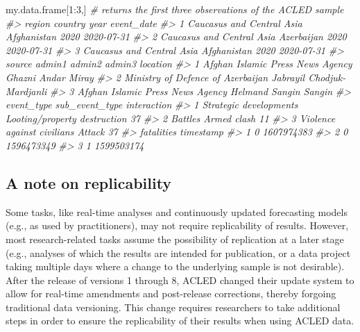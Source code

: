 \documentclass[
]{article}
\newenvironment{Shaded}{\begin{snugshade}}{\end{snugshade}}
\newcommand{\CommentTok}[1]{\textcolor[rgb]{0.56,0.35,0.01}{\textit{#1}}}
\newcommand{\DecValTok}[1]{\textcolor[rgb]{0.00,0.00,0.81}{#1}}
\newcommand{\NormalTok}[1]{#1}
\newcommand{\SpecialCharTok}[1]{\textcolor[rgb]{0.00,0.00,0.00}{#1}}
\begin{document}
\begin{Shaded}
\begin{Highlighting}[]
\NormalTok{my.data.frame[}\DecValTok{1}\SpecialCharTok{:}\DecValTok{3}\NormalTok{,] }\CommentTok{\# returns the first three observations of the ACLED sample}
\CommentTok{\#\textgreater{}                      region     country year event\_date}
\CommentTok{\#\textgreater{} 1 Caucasus and Central Asia Afghanistan 2020 2020{-}07{-}31}
\CommentTok{\#\textgreater{} 2 Caucasus and Central Asia  Azerbaijan 2020 2020{-}07{-}31}
\CommentTok{\#\textgreater{} 3 Caucasus and Central Asia Afghanistan 2020 2020{-}07{-}31}
\CommentTok{\#\textgreater{}                              source   admin1 admin2 admin3          location}
\CommentTok{\#\textgreater{} 1  Afghan Islamic Press News Agency   Ghazni  Andar                    Miray}
\CommentTok{\#\textgreater{} 2 Ministry of Defence of Azerbaijan Jabrayil               Chodjuk{-}Mardjanli}
\CommentTok{\#\textgreater{} 3  Afghan Islamic Press News Agency  Helmand Sangin                   Sangin}
\CommentTok{\#\textgreater{}                   event\_type               sub\_event\_type interaction}
\CommentTok{\#\textgreater{} 1     Strategic developments Looting/property destruction          37}
\CommentTok{\#\textgreater{} 2                    Battles                  Armed clash          11}
\CommentTok{\#\textgreater{} 3 Violence against civilians                       Attack          37}
\CommentTok{\#\textgreater{}   fatalities  timestamp}
\CommentTok{\#\textgreater{} 1          0 1607974383}
\CommentTok{\#\textgreater{} 2          0 1596473349}
\CommentTok{\#\textgreater{} 3          1 1599503174}
\end{Highlighting}
\end{Shaded}

\hypertarget{a-note-on-replicability}{%
\subsection{A note on replicability}\label{a-note-on-replicability}}

Some tasks, like real-time analyses and continuously updated forecasting
models (e.g., as used by practitioners), may not require replicability
of results. However, most research-related tasks assume the possibility
of replication at a later stage (e.g., analyses of which the results are
intended for publication, or a data project taking multiple days where a
change to the underlying sample is not desirable). After the release of
versions 1 through 8, ACLED changed their update system to allow for
real-time amendments and post-release corrections, thereby forgoing
traditional data versioning. This change requires researchers to take
additional steps in order to ensure the replicability of their results
when using ACLED data.
\end{document}
